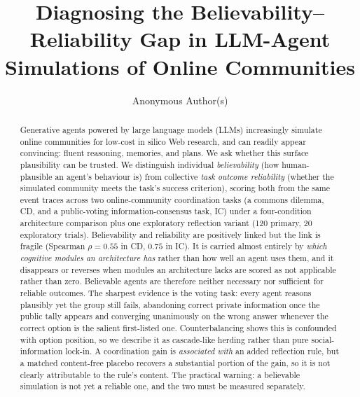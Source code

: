\documentclass[runningheads]{llncs}
\begin{document}
\title{Diagnosing the Believability--Reliability Gap in LLM-Agent Simulations of Online Communities}
\author{Anonymous Author(s)}
\maketitle


\begin{abstract}
Generative agents powered by large language models (LLMs) increasingly simulate online
communities for low-cost in silico Web research, and can readily appear convincing: fluent
reasoning, memories, and plans. We ask whether this surface plausibility can be trusted. We
distinguish individual \emph{believability} (how human-plausible an agent's behaviour is) from
collective \emph{task outcome reliability} (whether the simulated community meets the task's
success criterion), scoring both from the same event traces across two online-community
coordination tasks (a commons dilemma, CD, and a public-voting information-consensus task, IC)
under a four-condition architecture comparison plus one exploratory reflection variant (120
primary, 20 exploratory trials). Believability and reliability are positively linked but the link
is fragile (Spearman $\rho=0.55$ in CD, $0.75$ in IC). It is carried almost entirely
by \emph{which cognitive modules an architecture has} rather than how well an agent uses them, and
it disappears or reverses when modules an architecture lacks are scored as not applicable rather
than zero. Believable agents are therefore neither necessary nor sufficient for reliable outcomes. The
sharpest evidence is the voting task: every agent reasons plausibly yet the group still fails,
abandoning correct private information once the public tally appears and converging unanimously
on the wrong answer whenever the correct option is the salient first-listed one. Counterbalancing
shows this is confounded with option position, so we describe it as cascade-like herding rather
than pure social-information lock-in. A coordination gain is \emph{associated with} an added
reflection rule, but a matched content-free placebo recovers a substantial portion of the gain, so
it is not clearly attributable to the rule's content. The practical warning: a believable
simulation is not yet a reliable one, and the two must be measured separately.
\end{abstract}
\end{document}

